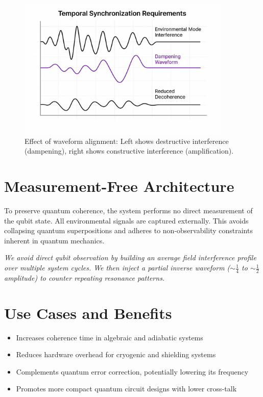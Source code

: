 \documentclass[12pt]{article}
\begin{document}
\begin{figure}[h!]
    \centering
    \includegraphics[width=0.9\textwidth]{Quantum_Waveform_Interference.jpg}
    \caption{Effect of waveform alignment: Left shows destructive interference (dampening), right shows constructive interference (amplification).}
    \label{fig:waveform_interference}
\end{figure}

\section*{Measurement-Free Architecture}
To preserve quantum coherence, the system performs no direct measurement of the qubit state. All environmental signals are captured externally. This avoids collapsing quantum superpositions and adheres to non-observability constraints inherent in quantum mechanics.

\medskip
\noindent
\textit{We avoid direct qubit observation by building an average field interference profile over multiple system cycles. We then inject a partial inverse waveform ($\sim \frac{1}{4}$ to $\sim \frac{1}{2}$ amplitude) to counter repeating resonance patterns.}

\section*{Use Cases and Benefits}
\begin{itemize}
  \item Increases coherence time in algebraic and adiabatic systems
  \item Reduces hardware overhead for cryogenic and shielding systems
  \item Complements quantum error correction, potentially lowering its frequency
  \item Promotes more compact quantum circuit designs with lower cross-talk
\end{itemize}
\end{document}
